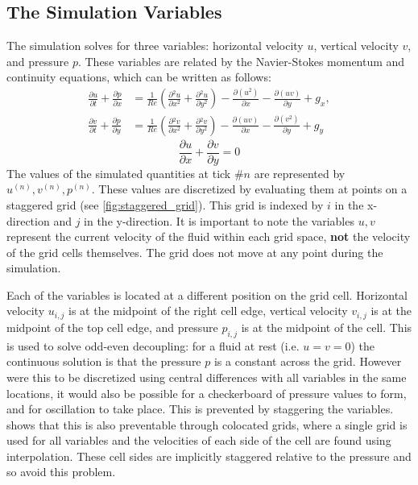 \subsection{The Simulation Variables}
The simulation solves for three variables: horizontal velocity $u$, vertical velocity $v$, and pressure $p$.
These variables are related by the Navier-Stokes momentum and continuity equations, which can be written as follows:
\newcommand{\partialderiv}[2]{\frac{\partial{#1}}{\partial{#2}}}
\newcommand{\paren}[1]{\left(#1\right)}
\begin{equation}
\begin{aligned}
    \partialderiv{u}{t} + \partialderiv{p}{x} &= \frac{1}{Re}\paren{ \partialderiv{^2u}{x^2} + \partialderiv{^2u}{y^2}} - \partialderiv{(u^2)}{x} - \partialderiv{(uv)}{y} + g_x, \\
    \partialderiv{v}{t} + \partialderiv{p}{y} &= \frac{1}{Re}\paren{ \partialderiv{^2v}{x^2} + \partialderiv{^2v}{y^2}} - \partialderiv{(uv)}{x} - \partialderiv{(v^2)}{y} + g_y
    \label{eq:NavierStokesMomentum}
\end{aligned}
\end{equation}
\begin{equation}
\label{eq:NavierStokesContinuity}
    \frac{\partial{u}}{\partial{x}} + \frac{\partial{v}}{\partial{y}} = 0
\end{equation}
The values of the simulated quantities at tick $\#n$ are represented by $u^{(n)}, v^{(n)}, p^{(n)}$.
These values are discretized by evaluating them at points on a staggered grid (see \cref{fig:staggered_grid}).
This grid is indexed by $i$ in the x-direction and $j$ in the y-direction.
It is important to note the variables $u,v$ represent the current velocity of the fluid within each grid space, \textbf{not} the velocity of the grid cells themselves.
The grid does not move at any point during the simulation.



Each of the variables is located at a different position on the grid cell.
Horizontal velocity $u_{i,j}$ is at the midpoint of the right cell edge, vertical velocity $v_{i,j}$ is at the midpoint of the top cell edge, and pressure $p_{i,j}$ is at the midpoint of the cell.
This is used to solve odd-even decoupling\cite{Harlow1965NumericalSurface}: for a fluid at rest (i.e. $u = v = 0$) the continuous solution is that the pressure $p$ is a constant across the grid.
However were this to be discretized using central differences with all variables in the same locations, it would also be possible for a checkerboard of pressure values to form, and for oscillation to take place\cite{book:griebel1998numerical}.
This is prevented by staggering the variables.
\cite{peric1988comparison} shows that this is also preventable through colocated grids, where a single grid is used for all variables and the velocities of each side of the cell are found using interpolation.
These cell sides are implicitly staggered relative to the pressure and so avoid this problem.

